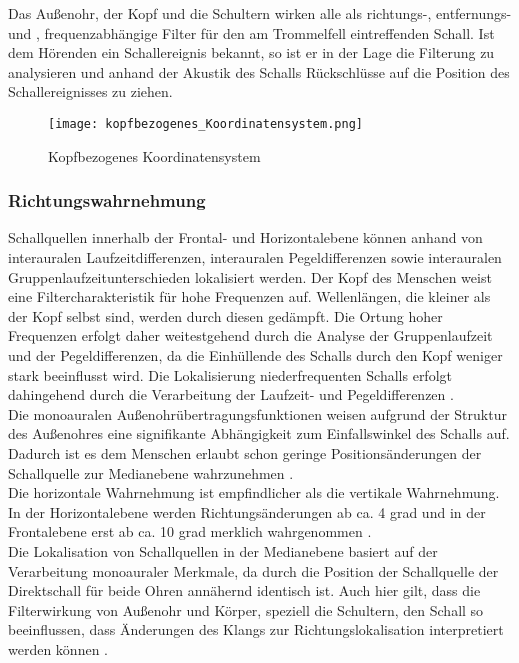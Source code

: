 Das Außenohr, der Kopf und die Schultern wirken alle als richtungs-, entfernungs- und , frequenzabhängige Filter für den am Trommelfell eintreffenden Schall. Ist dem Hörenden ein Schallereignis bekannt, so ist er in der Lage die Filterung zu analysieren und anhand der Akustik des Schalls Rückschlüsse auf die Position des Schallereignisses zu ziehen.

\begin{figure}[H]
\centering
\texttt{[image: kopfbezogenes\_Koordinatensystem.png]}
\caption{Kopfbezogenes Koordinatensystem}
\label{fig:Kopfbezogenes_Koordinatensystem}
\end{figure}

\subsubsection{Richtungswahrnehmung}

Schallquellen innerhalb der Frontal- und Horizontalebene können anhand von interauralen Laufzeitdifferenzen, interauralen Pegeldifferenzen sowie interauralen Gruppenlaufzeitunterschieden lokalisiert werden. Der Kopf des Menschen weist eine Filtercharakteristik für hohe Frequenzen auf. Wellenlängen, die kleiner als der Kopf selbst sind, werden durch diesen gedämpft. Die Ortung hoher Frequenzen erfolgt daher weitestgehend durch die Analyse der Gruppenlaufzeit und der Pegeldifferenzen, da die Einhüllende des Schalls durch den Kopf weniger stark beeinflusst wird. Die Lokalisierung niederfrequenten Schalls erfolgt dahingehend durch die Verarbeitung der Laufzeit- und Pegeldifferenzen \cite[S.45]{Genuit10}. \\ 

Die monoauralen Außenohrübertragungsfunktionen weisen aufgrund der Struktur des Außenohres eine signifikante Abhängigkeit zum Einfallswinkel des Schalls auf. Dadurch ist es dem Menschen erlaubt schon geringe Positionsänderungen der Schallquelle zur Medianebene wahrzunehmen \cite[S.46]{Genuit10}. \\ 

Die horizontale Wahrnehmung ist empfindlicher als die vertikale Wahrnehmung. In der Horizontalebene werden Richtungsänderungen ab ca. 4 grad und in der Frontalebene erst ab ca. 10 grad merklich wahrgenommen \cite[S.95]{HdA08}.  \\

Die Lokalisation von Schallquellen in der Medianebene  basiert auf der Verarbeitung monoauraler Merkmale, da durch die Position der Schallquelle der Direktschall für beide Ohren annähernd identisch ist. Auch hier gilt, dass die Filterwirkung von Außenohr und Körper, speziell die Schultern, den Schall so beeinflussen, dass Änderungen des Klangs zur Richtungslokalisation interpretiert werden können \cite[S.46]{Genuit10}. \\

